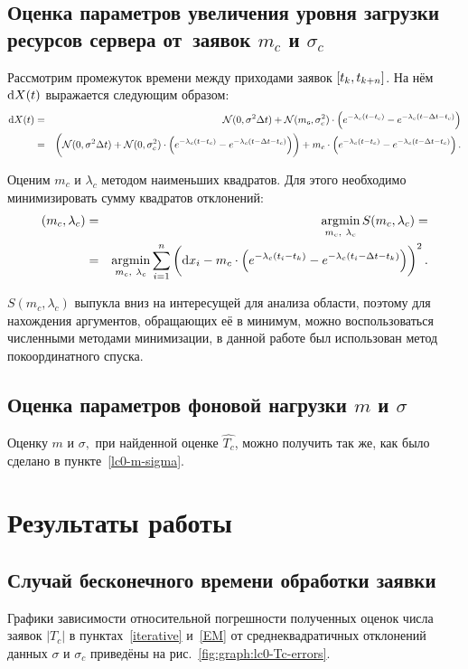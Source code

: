 \documentclass[a4paper,10pt]{article}
\DeclareMathOperator*{\argmin}{\arg\!\min}
\begin{document}
\subsection{Оценка параметров увеличения уровня загрузки ресурсов сервера %
от~заявок $m_c$ и $\sigma_c$}
Рассмотрим промежуток времени между приходами заявок $\sbr{t_k, t_{k+n}}$. 
На нём $\dif X(t)$ выражается следующим образом:
\begin{eqnarray*}
\dif X(t) 
  & = & \mathcal{N}(0, \sigma^2 \Delta t) + 
      \mathcal{N}(m_c, \sigma_c^2) \cdot 
        \del{e^{-\lambda_c(t - t_c)} - e^{-\lambda_c(t - \Delta t - t_c)}} \\
  & = & \del{
      \mathcal{N}(0, \sigma^2 \Delta t) + 
      \mathcal{N}(0, \sigma_c^2) \cdot 
        \del{e^{-\lambda_c(t - t_c)} - e^{-\lambda_c(t - \Delta t - t_c)}}} +
      m_c \cdot 
        \del{e^{-\lambda_c(t - t_c)} - e^{-\lambda_c(t - \Delta t - t_c)}}.
\end{eqnarray*}

Оценим $m_c$ и $\lambda_c$ методом наименьших квадратов.
Для этого необходимо минимизировать сумму квадратов отклонений:
\begin{eqnarray*}
\del{m_c, \lambda_c} 
  & = & \argmin\limits_{m_c,\ \lambda_c} S(m_c, \lambda_c) = \\
  & = & \argmin\limits_{m_c,\ \lambda_c} \sum\limits_{i=1}^{n} 
    \del{\dif x_i - m_c \cdot 
      \del{e^{-\lambda_c(t_i - t_k)} - 
           e^{-\lambda_c(t_i - \Delta t - t_k)}}}^2.
\end{eqnarray*}

$S(m_c, \lambda_c)$ выпукла вниз на интересущей для анализа области, 
поэтому для нахождения аргументов, обращающих её в минимум, 
можно воспользоваться численными методами минимизации, в данной работе
был использован метод покоординатного спуска.

\subsection{Оценка параметров фоновой нагрузки $m$ и $\sigma$}
Оценку $m$ и $\sigma,$ при найденной оценке $\widehat{T_c}$, можно 
получить так же, как было сделано в пункте~\ref{lc0-m-sigma}.

\section{Результаты работы}
\subsection{Случай бесконечного времени обработки заявки}
Графики зависимости относительной погрешности полученных оценок числа 
заявок $|T_c|$ в пунктах~\ref{iterative} и~\ref{EM} 
от среднеквадратичных отклонений данных $\sigma$ и $\sigma_c$
приведёны на рис.~\ref{fig:graph:lc0-Tc-errors}.
\end{document}
